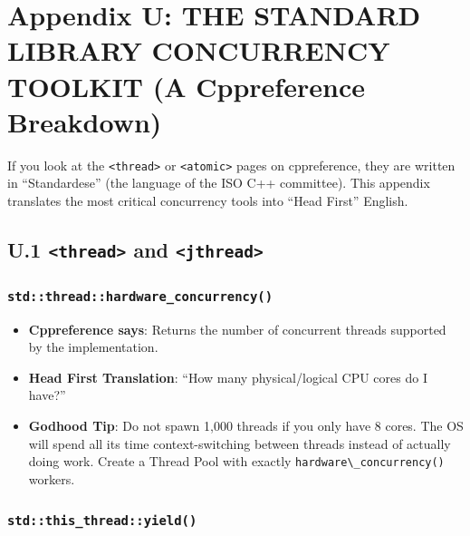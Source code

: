 \hypertarget{appendix-u-the-standard-library-concurrency-toolkit-a-cppreference-breakdown}{%
\section{Appendix U: THE STANDARD LIBRARY CONCURRENCY TOOLKIT (A
Cppreference
Breakdown)}\label{appendix-u-the-standard-library-concurrency-toolkit-a-cppreference-breakdown}}

If you look at the \passthrough{\lstinline!<thread>!} or
\passthrough{\lstinline!<atomic>!} pages on cppreference, they are
written in ``Standardese'' (the language of the ISO C++ committee). This
appendix translates the most critical concurrency tools into ``Head
First'' English.

\hypertarget{u.1-thread-and-jthread}{%
\subsection{\texorpdfstring{U.1 \texttt{\textless{}thread\textgreater{}}
and
\texttt{\textless{}jthread\textgreater{}}}{U.1 \textless thread\textgreater{} and \textless jthread\textgreater{}}}\label{u.1-thread-and-jthread}}

\hypertarget{stdthreadhardware_concurrency}{%
\subsubsection{\texorpdfstring{\texttt{std::thread::hardware\_concurrency()}}{std::thread::hardware\_concurrency()}}\label{stdthreadhardware_concurrency}}

\begin{itemize}
\tightlist
\item
  \textbf{Cppreference says}: Returns the number of concurrent threads
  supported by the implementation.
\item
  \textbf{Head First Translation}: ``How many physical/logical CPU cores
  do I have?''
\item
  \textbf{Godhood Tip}: Do not spawn 1,000 threads if you only have 8
  cores. The OS will spend all its time context-switching between
  threads instead of actually doing work. Create a Thread Pool with
  exactly \passthrough{\lstinline!hardware\_concurrency()!} workers.
\end{itemize}

\hypertarget{stdthis_threadyield}{%
\subsubsection{\texorpdfstring{\texttt{std::this\_thread::yield()}}{std::this\_thread::yield()}}\label{stdthis_threadyield}}

